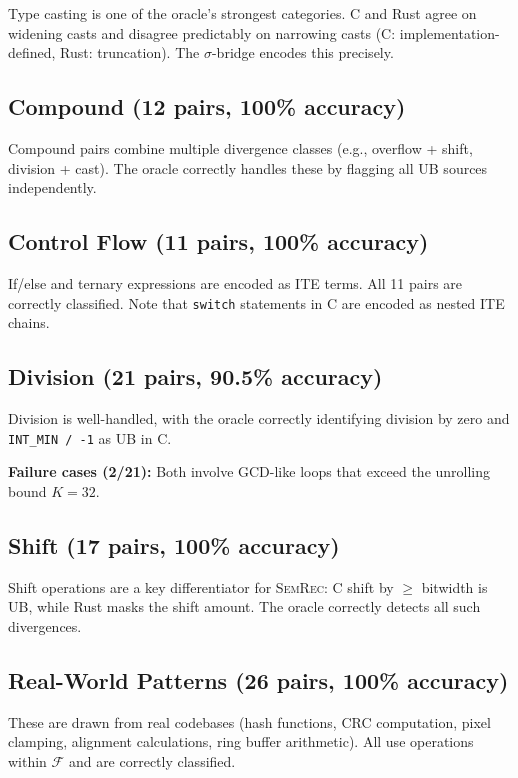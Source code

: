 \documentclass[11pt]{article}
\newcommand{\semrec}{\textsc{SemRec}}
\newcommand{\sigbridge}{$\sigma$-bridge}
\begin{document}
Type casting is one of the oracle's strongest categories.  C and Rust agree
on widening casts and disagree predictably on narrowing casts (C:
implementation-defined, Rust: truncation).  The \sigbridge{} encodes this
precisely.

\subsection{Compound (12 pairs, 100\% accuracy)}

Compound pairs combine multiple divergence classes (e.g., overflow + shift,
division + cast).  The oracle correctly handles these by flagging all UB
sources independently.

\subsection{Control Flow (11 pairs, 100\% accuracy)}

If/else and ternary expressions are encoded as ITE terms.  All 11 pairs are
correctly classified.  Note that \texttt{switch} statements in C are encoded
as nested ITE chains.

\subsection{Division (21 pairs, 90.5\% accuracy)}

Division is well-handled, with the oracle correctly identifying division by
zero and \texttt{INT\_MIN / -1} as UB in C.

\textbf{Failure cases (2/21):}
Both involve GCD-like loops that exceed the unrolling bound $K = 32$.

\subsection{Shift (17 pairs, 100\% accuracy)}

Shift operations are a key differentiator for \semrec{}: C shift by $\geq$
bitwidth is UB, while Rust masks the shift amount.  The oracle correctly
detects all such divergences.

\subsection{Real-World Patterns (26 pairs, 100\% accuracy)}

These are drawn from real codebases (hash functions, CRC computation, pixel
clamping, alignment calculations, ring buffer arithmetic).  All use
operations within $\mathcal{F}$ and are correctly classified.
\end{document}
